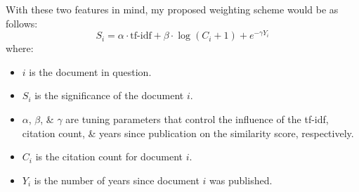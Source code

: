 \documentclass[a4paper]{article}
\begin{document}
With these two features in mind, my proposed weighting scheme would be as follows:
\[
    S_i = \alpha \cdot \text{tf-idf} + \beta \cdot \log(C_i + 1) + e^{- \gamma Y_i}
\]
where:
\begin{itemize}
    \item   $i$ is the document in question.
    \item   $S_i$ is the significance of the document $i$.
    \item   $\alpha$, $\beta$, \& $\gamma$ are tuning parameters that control the influence of the tf-idf, citation count, \& years since publication on the similarity score, respectively.
    \item   $C_i$ is the citation count for document $i$.
    \item   $Y_i$ is the number of years since document $i$ was published.
\end{itemize}

\nocite{*}
\printbibliography
\end{document}
